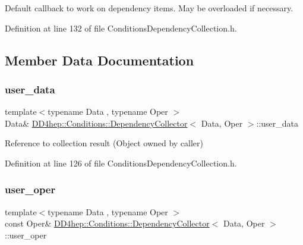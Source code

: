 Default callback to work on dependency items. May be overloaded if necessary. 



Definition at line 132 of file Conditions\+Dependency\+Collection.\+h.



\subsection{Member Data Documentation}
\hypertarget{class_d_d4hep_1_1_conditions_1_1_dependency_collector_a65456b4691406f0da2334732909465a0}{}\label{class_d_d4hep_1_1_conditions_1_1_dependency_collector_a65456b4691406f0da2334732909465a0} 
\subsubsection{\texorpdfstring{user\+\_\+data}{user\_data}}
{\footnotesize\ttfamily template$<$typename Data , typename Oper $>$ \\
Data\& \hyperlink{class_d_d4hep_1_1_conditions_1_1_dependency_collector}{D\+D4hep\+::\+Conditions\+::\+Dependency\+Collector}$<$ Data, Oper $>$\+::user\+\_\+data}



Reference to collection result (Object owned by caller) 



Definition at line 126 of file Conditions\+Dependency\+Collection.\+h.

\hypertarget{class_d_d4hep_1_1_conditions_1_1_dependency_collector_af0056586d4f62f93837c38e0ec32ba5a}{}\label{class_d_d4hep_1_1_conditions_1_1_dependency_collector_af0056586d4f62f93837c38e0ec32ba5a} 
\subsubsection{\texorpdfstring{user\+\_\+oper}{user\_oper}}
{\footnotesize\ttfamily template$<$typename Data , typename Oper $>$ \\
const Oper\& \hyperlink{class_d_d4hep_1_1_conditions_1_1_dependency_collector}{D\+D4hep\+::\+Conditions\+::\+Dependency\+Collector}$<$ Data, Oper $>$\+::user\+\_\+oper}



